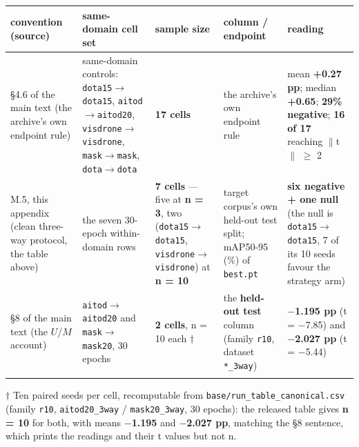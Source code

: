 \documentclass[pdflatex,sn-mathphys-ay]{sn-jnl}
\begin{document}
{\footnotesize
\setlength{\tabcolsep}{4pt}
\begin{longtable}{p{}p{}p{}p{}p{}}
\toprule
convention (source) & same-domain cell set & sample size & column / endpoint & reading \\
\midrule
\endhead
\S{}4.6 of the main text (the archive's own endpoint rule) & same-domain controls: \texttt{dota15\ensuremath{\rightarrow}dota15}, \texttt{aitod\ensuremath{\rightarrow}aitod20}, \texttt{visdrone\ensuremath{\rightarrow}visdrone}, \texttt{mask\ensuremath{\rightarrow}mask}, \texttt{dota\ensuremath{\rightarrow}dota} & \textbf{17 cells} & the archive's own endpoint rule & mean \textbf{+0.27 pp}; median \textbf{+0.65}; \textbf{29\% negative}; \textbf{16 of 17} reaching $\|$t$\|$ \ensuremath{\geq} 2 \\
M.5, this appendix (clean three-way protocol, the table above) & the seven 30-epoch within-domain rows & \textbf{7 cells} --- five at \textbf{n = 3}, two (\texttt{dota15\ensuremath{\rightarrow}dota15}, \texttt{visdrone\ensuremath{\rightarrow}visdrone}) at \textbf{n = 10} & target corpus's own held-out test split; mAP50-95 (\%) of \texttt{best.pt} & \textbf{six negative + one null} (the null is \texttt{dota15\ensuremath{\rightarrow}dota15}, 7 of its 10 seeds favour the strategy arm) \\
\S{}8 of the main text (the $U$/$M$ account) & \texttt{aitod\ensuremath{\rightarrow}aitod20} and \texttt{mask\ensuremath{\rightarrow}mask20}, 30 epochs & \textbf{2 cells}, n = 10 each \ensuremath{\dagger} & the \textbf{held-out test} column (family \texttt{r10}, dataset \texttt{*\_3way}) & \textbf{\ensuremath{-}1.195 pp} (t = \ensuremath{-}7.85) and \textbf{\ensuremath{-}2.027 pp} (t = \ensuremath{-}5.44) \\
\botrule
\end{longtable}}

\ensuremath{\dagger} Ten paired seeds per cell, recomputable from \texttt{base/run\_table\_canonical.csv} (family \texttt{r10}, \texttt{aitod20\_3way} / \texttt{mask20\_3way}, 30 epochs): the released table gives \textbf{n = 10} for both, with means \textbf{\ensuremath{-}1.195} and \textbf{\ensuremath{-}2.027 pp}, matching the \S{}8 sentence, which prints the readings and their t values but not n.
\end{document}
